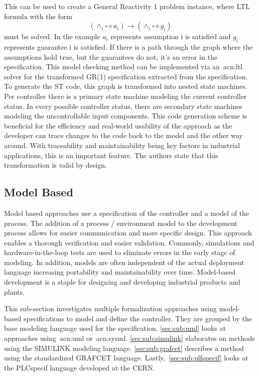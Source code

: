 This can be used to create a General Reactivity 1 problem instance, where LTL formula with the form
\begin{equation}
\left(\land_{i}\square\diamond a_{i} \right) \rightarrow \left(\land_{i}\square\diamond g_{i} \right)
\end{equation}
must be solved.
In the example $a_{i}$ represents assumption i is satisfied and $g_{i}$ represents guarantee i is satisfied.
If there is a path through the graph where the assumptions hold true, but the guarantees do not, it's an error in the specification.
This model checking method can be implemented via an~\acrshort{acn:ltl} solver for the transformed GR(1) specification extracted from the specification.
To generate the ST code, this graph is transformed into nested state machines.
Per controller there is a primary state machine modeling the current controller status.
In every possible controller status, there are secondary state machines modeling the uncontrollable input components.
This code generation scheme is beneficial for the efficiency and real-world usability of the approach as the developer can trace changes to the code back to the model and the other way around.
With traceability and maintainability being key factors in industrial applications, this is an important feature.
The authors state that this transformation is valid by design.
\subsection{Model Based}
\label{sec:sub:mb}
Model based approaches use a specification of the controller and a model of the process.
The addition of a process / environment model to the development process allows for easier communication and more specific design.
This approach enables a thorough verification and easier validation.
Commonly, simulations and hardware-in-the-loop tests are used to eliminate errors in the early stage of modeling.
In addition, models are often independent of the actual deployment language increasing portability and maintainability over time.
Model-based development is a staple for designing and developing industrial products and plants.

This sub-section investigates multiple formalization approaches using model-based specifications to model and define the controller.
They are grouped by the base modeling language used for the specification.
\ref{sec:sub:uml} looks at approaches using~\acrshort{acn:uml} or~\acrlong{acn:sysml}.
\ref{sec:sub:simulink} elaborates on methods using the SIMULINK modeling language.
\ref{sec:sub:grafcet} describes a method using the standardized GRAFCET language.
Lastly,~\ref{sec:sub:plfspecif} looks at the PLCspecif language developed at the CERN.
